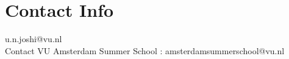 \section{Contact Info}
u.n.joshi@vu.nl \\
Contact VU Amsterdam Summer School : amsterdamsummerschool@vu.nl
